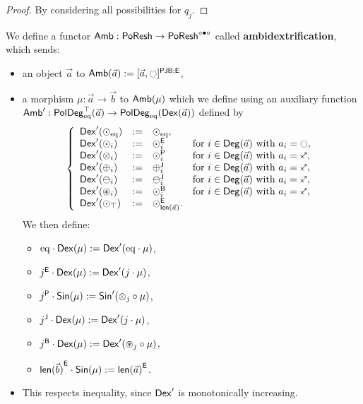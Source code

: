 \documentclass[a4paper]{memoir}
\begin{document}
\begin{proof}
	By considering all possibilities for $q_j$.
\end{proof}
\begin{definition} \label{def:poresh-amb}
	We define a functor ${\mathsf{Amb}} : \mathsf{PoResh} \to \mathsf{PoResh}^{\circ \bullet \circ}$ called \textbf{ambidextrification}, which sends:
	\begin{itemize}
		\item an object $\vec a$ to $\Amb(\vec a) := \maskop{[\vec a, \npolar]}{\maskpjb}{\maske}$,
		\item a morphism $\mu : \vec a \to \vec b$ to ${\mathsf{Amb}}(\mu)$ which we define using an auxiliary function ${\mathsf{Amb}}' : \mathsf{PolDeg}_{\mathrm{eq}}^\top(\vec a) \to \mathsf{PolDeg}_{\mathrm{eq}}({\mathsf{Dex}}(\vec a))$ defined by
		\[
			\left\{ \begin{array}{l l l l}
				\Dex'(\nonpol_\eqtydeg) &:=& \nonpol_\eqtydeg, \\
				\Dex'(\nonpol_i) &:=& \nwnonpol_i &\text{for $i \in \Deg(\vec a)$ with $a_i = \npolar$}, \\
				\Dex'(\mixpol_i) &:=& \nwpathpol_i &\text{for $i \in \Deg(\vec a)$ with $a_i = \ypolar$}, \\
				\Dex'(\pospol_i) &:=& \nwpospol_i &\text{for $i \in \Deg(\vec a)$ with $a_i = \ypolar$}, \\
				\Dex'(\negpol_i) &:=& \nwnegpol_i &\text{for $i \in \Deg(\vec a)$ with $a_i = \ypolar$}, \\
				\Dex'(\isopol_i) &:=& \nwbridgepol_i &\text{for $i \in \Deg(\vec a)$ with $a_i = \ypolar$}, \\
				\Dex'(\nonpol_\top) &:=& \nwnonpol_{\lenpol{\vec a}}. \\
			\end{array} \right.
		\]
		We then define:
		\begin{itemize}
			\item ${\mathrm{eq}} \cdot {\mathsf{Dex}}(\mu) := {\mathsf{Dex}}'({\mathrm{eq}} \cdot \mu)$,
			\item ${j}^{\mathsf{E}} \cdot {\mathsf{Dex}}(\mu) := {\mathsf{Dex}}'(j \cdot \mu)$,
			\item ${j}^{\mathsf{P}} \cdot {\mathsf{Sin}}(\mu) := {\mathsf{Sin}}'({\otimes}_j \circ \mu)$,
			\item ${j}^{\mathsf{J}} \cdot {\mathsf{Dex}}(\mu) := {\mathsf{Dex}}'(j \cdot \mu)$,
			\item ${j}^{\mathsf{B}} \cdot {\mathsf{Dex}}(\mu) := {\mathsf{Dex}}'({\oast}_j \circ \mu)$,
			\item ${\mathsf{len}(\vec b)}^{\mathsf{E}} \cdot {\mathsf{Sin}}(\mu) := {\mathsf{len}(\vec a)}^{\mathsf{E}}$.
		\end{itemize}
		\item This respects inequality, since ${\mathsf{Dex}}'$ is monotonically increasing.
	\end{itemize}
\end{definition}
\end{document}
